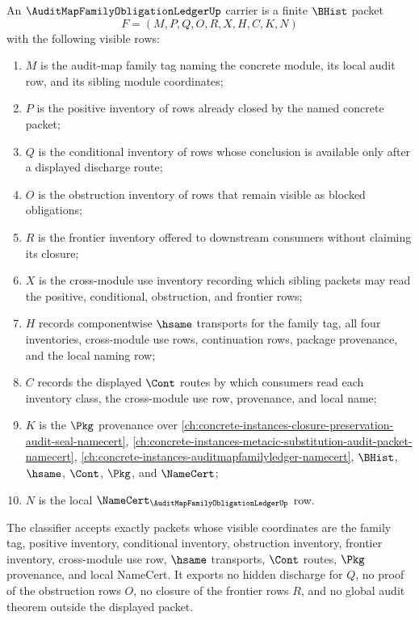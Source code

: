 \begin{definition}
\label{def:audit-map-family-obligation-ledger-carrier}
An $\AuditMapFamilyObligationLedgerUp$ carrier is a finite $\BHist$ packet
$$
F=(M,P,Q,O,R,X,H,C,K,N)
$$
with the following visible rows:
\begin{enumerate}
\item $M$ is the audit-map family tag naming the concrete module, its local audit row, and its sibling module coordinates;
\item $P$ is the positive inventory of rows already closed by the named concrete packet;
\item $Q$ is the conditional inventory of rows whose conclusion is available only after a displayed discharge route;
\item $O$ is the obstruction inventory of rows that remain visible as blocked obligations;
\item $R$ is the frontier inventory offered to downstream consumers without claiming its closure;
\item $X$ is the cross-module use inventory recording which sibling packets may read the positive, conditional, obstruction, and frontier rows;
\item $H$ records componentwise $\hsame$ transports for the family tag, all four inventories, cross-module use rows, continuation rows, package provenance, and the local naming row;
\item $C$ records the displayed $\Cont$ routes by which consumers read each inventory class, the cross-module use row, provenance, and local name;
\item $K$ is the $\Pkg$ provenance over \autoref{ch:concrete-instances-closure-preservation-audit-seal-namecert}, \autoref{ch:concrete-instances-metacic-substitution-audit-packet-namecert}, \autoref{ch:concrete-instances-auditmapfamilyledger-namecert}, $\BHist$, $\hsame$, $\Cont$, $\Pkg$, and $\NameCert$;
\item $N$ is the local $\NameCert_{\AuditMapFamilyObligationLedgerUp}$ row.
\end{enumerate}
The classifier accepts exactly packets whose visible coordinates are the family tag, positive inventory, conditional inventory, obstruction inventory, frontier inventory, cross-module use row, $\hsame$ transports, $\Cont$ routes, $\Pkg$ provenance, and local NameCert. It exports no hidden discharge for $Q$, no proof of the obstruction rows $O$, no closure of the frontier rows $R$, and no global audit theorem outside the displayed packet.
\end{definition}

